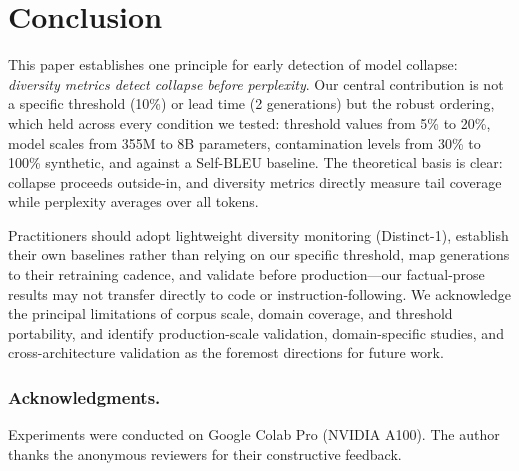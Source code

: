 \documentclass{svproc}
\newcommand{\dist}[1]{Distinct-#1}
\begin{document}
\section{Conclusion}\label{sec:conclusion}
This paper establishes one principle for early detection of model collapse:
\emph{diversity metrics detect collapse before perplexity}. Our central
contribution is not a specific threshold (10\%) or lead time (2 generations) but the
robust ordering, which held across every condition we tested: threshold values from
5\% to 20\%, model scales from 355M to 8B parameters, contamination levels from 30\%
to 100\% synthetic, and against a Self-BLEU baseline. The theoretical basis is
clear: collapse proceeds outside-in, and diversity metrics directly measure tail
coverage while perplexity averages over all tokens.

Practitioners should adopt lightweight diversity monitoring (\dist{1}), establish
their own baselines rather than relying on our specific threshold, map generations
to their retraining cadence, and validate before production---our factual-prose
results may not transfer directly to code or instruction-following. We acknowledge
the principal limitations of corpus scale, domain coverage, and threshold
portability, and identify production-scale validation, domain-specific studies, and
cross-architecture validation as the foremost directions for future work.

\subsubsection*{Acknowledgments.} Experiments were conducted on Google Colab Pro
(NVIDIA A100). The author thanks the anonymous reviewers for their constructive
feedback.
\end{document}
